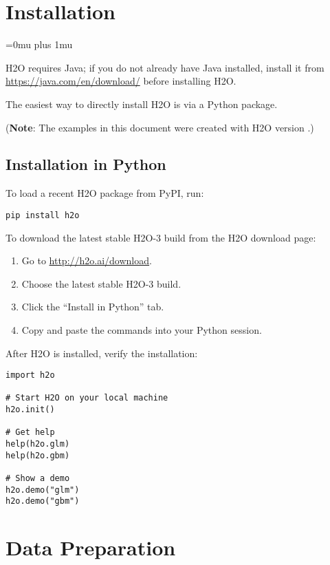 \section{Installation} 
\Urlmuskip=0mu plus 1mu\relax %

H2O requires Java; if you do not already have Java installed, install it from {\url{https://java.com/en/download/}} before installing H2O. 

The easiest way to directly install H2O is  via a Python package.

({\bf{Note}}: The examples in this document were created with H2O version \waterVersion.)

\subsection{Installation in Python}

To load a recent H2O package from PyPI, run:

\begin{lstlisting}[style=python]
pip install h2o
\end{lstlisting}

To download the
latest stable H2O-3 build from the H2O download page:

\begin{enumerate}
\item Go to {\url{http://h2o.ai/download}}.
\item Choose the latest stable H2O-3 build.
\item Click the ``Install in Python'' tab.
\item Copy and paste the commands into your Python session.
\end{enumerate}


\bigskip
After H2O is installed, verify the installation:

\begin{lstlisting}[style=python]
import h2o

# Start H2O on your local machine
h2o.init()

# Get help
help(h2o.glm)
help(h2o.gbm)

# Show a demo
h2o.demo("glm")
h2o.demo("gbm")

\end{lstlisting}



\section{Data Preparation}


